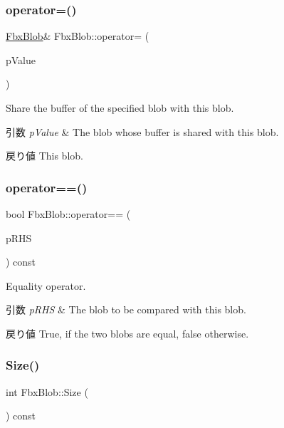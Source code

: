 \subsubsection{\texorpdfstring{operator=()}{operator=()}}
{\footnotesize\ttfamily \hyperlink{class_fbx_blob}{Fbx\+Blob}\& Fbx\+Blob\+::operator= (\begin{DoxyParamCaption}\item[{const \hyperlink{class_fbx_blob}{Fbx\+Blob} \&}]{p\+Value }\end{DoxyParamCaption})}

Share the buffer of the specified blob with this blob. 
\begin{DoxyParams}{引数}
{\em p\+Value} & The blob whose buffer is shared with this blob. \\
\hline
\end{DoxyParams}
\begin{DoxyReturn}{戻り値}
This blob. 
\end{DoxyReturn}
\mbox{\label{class_fbx_blob_ad8de66a73abbec7cb602653ca2008a6d}} 
\subsubsection{\texorpdfstring{operator==()}{operator==()}}
{\footnotesize\ttfamily bool Fbx\+Blob\+::operator== (\begin{DoxyParamCaption}\item[{const \hyperlink{class_fbx_blob}{Fbx\+Blob} \&}]{p\+R\+HS }\end{DoxyParamCaption}) const}

Equality operator. 
\begin{DoxyParams}{引数}
{\em p\+R\+HS} & The blob to be compared with this blob. \\
\hline
\end{DoxyParams}
\begin{DoxyReturn}{戻り値}
{\ttfamily True}, if the two blobs are equal, {\ttfamily false} otherwise. 
\end{DoxyReturn}
\mbox{\label{class_fbx_blob_a4b391b461d5303f6a1f24ae910b4e5c8}} 
\subsubsection{\texorpdfstring{Size()}{Size()}}
{\footnotesize\ttfamily int Fbx\+Blob\+::\+Size (\begin{DoxyParamCaption}{ }\end{DoxyParamCaption}) const}

